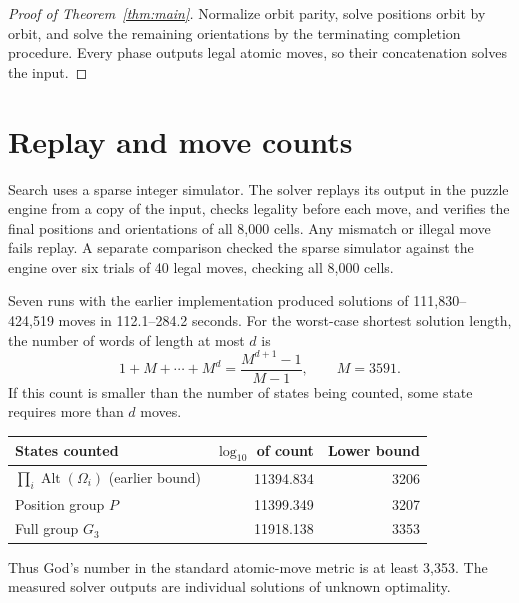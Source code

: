 \documentclass[a4paper,11pt]{article}
\theoremstyle{definition}
\newcommand{\Alt}{\operatorname{Alt}}
\begin{document}
\begin{proof}[Proof of Theorem~\ref{thm:main}]
Normalize orbit parity, solve positions orbit by orbit, and solve the
remaining orientations by the terminating completion procedure.
Every phase outputs legal atomic moves, so their concatenation solves
the input.
\end{proof}

\section{Replay and move counts}
Search uses a sparse integer simulator. The solver replays its output
in the puzzle engine from a copy of the input, checks legality before
each move, and verifies the final positions and orientations of all
8,000 cells. Any mismatch or illegal move fails replay.
A separate comparison checked the sparse simulator against the engine
over six trials of 40 legal moves, checking all 8,000 cells.

Seven runs with the earlier implementation produced solutions of
111,830--424,519 moves in 112.1--284.2 seconds. For the worst-case
shortest solution length, the number of words of length at most $d$ is
\[
1+M+\cdots+M^d=\frac{M^{d+1}-1}{M-1},\qquad M=3591.
\]
If this count is smaller than the number of states being counted,
some state requires more than $d$ moves.
\begin{center}
\begin{tabular}{lrr}
\toprule
States counted & $\log_{10}$ of count & Lower bound\\
\midrule
$\prod_i\Alt(\Omega_i)$ (earlier bound)&11394.834&3206\\
Position group $P$&11399.349&3207\\
Full group $G_3$&11918.138&3353\\
\bottomrule
\end{tabular}
\end{center}
Thus God's number in the standard atomic-move metric is at least
3,353. The measured solver outputs are individual solutions of
unknown optimality.
\end{document}

